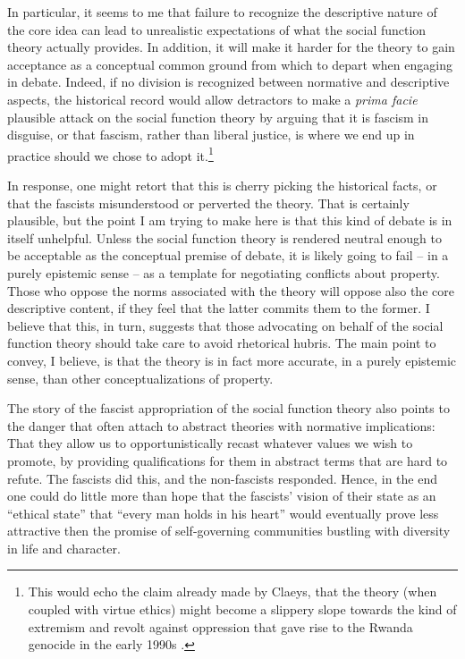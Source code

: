 In particular, it seems to me that failure to recognize the descriptive nature of the core idea can lead to unrealistic expectations of what the social function theory actually provides. In addition, it will make it harder for the theory to gain acceptance as a conceptual common ground from which to depart when engaging in debate. Indeed, if no division is recognized between normative and descriptive aspects, the historical record would allow detractors to make a {\it prima facie} plausible attack on the social function theory by arguing that it is fascism in disguise, or that fascism, rather than liberal justice, is where we end up in practice should we chose to adopt it.\footnote{This would echo the claim already made by Claeys, that the theory (when coupled with virtue ethics) might become a slippery slope towards the kind of extremism and revolt against oppression that gave rise to the Rwanda genocide in the early 1990s \cite[926-927]{claeys09}.}

In response, one might retort that this is cherry picking the historical facts, or that the fascists misunderstood or perverted the theory. That is certainly plausible, but the point I am trying to make here is that this kind of debate is in itself unhelpful. Unless the social function theory is rendered neutral enough to be acceptable as the conceptual premise of debate, it is likely going to fail -- in a purely epistemic sense -- as a template for negotiating conflicts about property. Those who oppose the norms associated with the theory will oppose also the core descriptive content, if they feel that the latter commits them to the former. I believe that this, in turn, suggests that those advocating on behalf of the social function theory should take care to avoid rhetorical hubris. The main point to convey, I believe, is that the theory is in fact more accurate, in a purely epistemic sense, than other conceptualizations of property.

The story of the fascist appropriation of the social function theory also points to the danger that often attach to abstract theories with normative implications: That they allow us to opportunistically recast whatever values we wish to promote, by providing qualifications for them in abstract terms that are hard to refute. The fascists did this, and the non-fascists responded. Hence, in the end one could do little more than hope that the fascists' vision of their state as an ``ethical state'' that ``every man holds in his heart'' would eventually prove less attractive then the promise of self-governing communities bustling with diversity in life and character.

